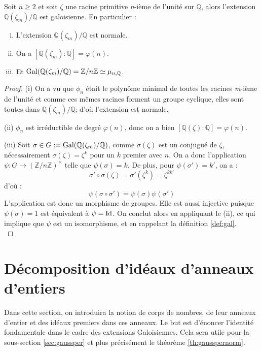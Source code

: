 \documentclass[a4paper]{article} %
\numberwithin{section}{part}
\numberwithin{equation}{section}
\newcommand\nroot[1]{\textit{#1}-ième}
\newcommand\zmodn[1]{\mathbb{Z}/#1\mathbb{Z}}
\newcommand\zmodninv[1]{(\mathbb{Z}/#1\mathbb{Z})^{\times}}
\newcommand\QQ{\mathbb{Q}}
\begin{document}
\begin{prop}
\label{prop:cyclgal}
Soit $n \geq 2$ et soit $\zeta$ une racine primitive \nroot{n} de l'unité sur 
$\QQ$, alors l'extension $\QQ(\zeta_m)/\QQ$ est galoisienne. En particulier :
\begin{enumerate}[(i)]
\item L'extension $\QQ(\zeta_m)/\QQ$ est normale.

\item On a $[\QQ(\zeta_m):\QQ] = \varphi(n)$.

\item Et $\textup{Gal}(\QQ(\zeta_m)/\QQ) = \zmodn{n} \simeq \mu_{n,\QQ}$.
\end{enumerate}
\end{prop}
\begin{proof}
(i) On a vu que $\phi_n$ était le polynôme minimal de toutes les racines 
\nroot{m} de l'unité et comme ces mêmes racines forment un groupe 
cyclique, elles sont toutes dans $\QQ(\zeta_m)/\QQ$; d'où l'extension est
normale.\par
(ii) $\phi_n$ est irréductible de degré $\varphi(n)$, donc on a bien
$[\QQ(\zeta):\QQ] = \varphi(n)$.\par
(iii) Soit $\sigma\in G := \textup{Gal}(\QQ(\zeta_m)/\QQ)$, comme 
$\sigma(\zeta)$ est un conjugué de $\zeta$, nécessairement $\sigma(\zeta) = 
\zeta^k$ pour un $k$ premier avec $n$. On a donc l'application $\psi : G \to 
\zmodninv{n}$ telle que $\psi(\sigma) = k$. De plus, pour $\psi(\sigma') = k'$, 
on a :
\[\sigma'\circ\sigma(\zeta) = \sigma'(\zeta^k) = \zeta^{kk'}\]
d'où :
\[\psi(\sigma\circ\sigma') = \psi(\sigma)\psi(\sigma')\]
L'application est donc un morphisme de groupes. Elle est aussi injective puisque
$\psi(\sigma) = 1$ est équivalent à $\psi = \textup{Id}$. On conclut alors en
appliquant le (ii), ce qui implique que $\psi$ est un isomorphisme, et en 
rappelant la définition \ref{def:gal}.\\
\end{proof}

\section{Décomposition d'idéaux d'anneaux d'entiers}
Dans cette section, on introduira la notion de corps de nombres, de leur
anneaux d'entier et des idéaux premiers dans ces anneaux. Le but est d'énoncer 
l'identité fondamentale dans le cadre des extensions Galoisiennes. Cela sera 
utile pour la sous-section \ref{sec:gaussper} et plus précisément le 
théorème \ref{th:gausspernorm}.
\end{document}

